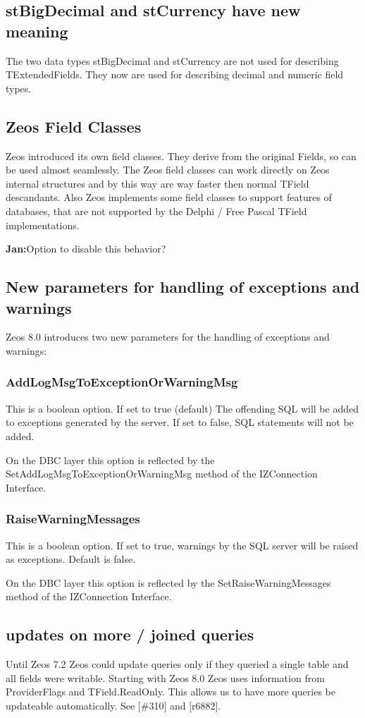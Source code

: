 \documentclass[a4paper,12pt,oneside]{article}
\begin{document}
\subsection{stBigDecimal and stCurrency have new meaning}
The two data types stBigDecimal and stCurrency are not used for describing TExtendedFields.
They now are used for describing decimal and numeric field types.

\subsection{Zeos Field Classes}
Zeos introduced its own field classes.
They derive from the original Fields, so can be used almost seamlessly.
The Zeos field classes can work directly on Zeos internal structures and by this way are way faster then normal TField descandants.
Also Zeos implements some field classes to support features of databases, that are not supported by the Delphi / Free Pascal TField implementations.

\textbf{Jan:}Option to disable this behavior?

\subsection{New parameters for handling of exceptions and warnings}
Zeos 8.0 introduces two new parameters for the handling of exceptions and warnings:

\subsubsection{AddLogMsgToExceptionOrWarningMsg }
This is a boolean option.
If set to true (default) The offending SQL will be added to exceptions generated by the server.
If set to false, SQL statements will not be added.

On the DBC layer this option is reflected by the SetAddLogMsgToExceptionOrWarningMsg method of the IZConnection Interface.

\subsubsection{RaiseWarningMessages}
This is a boolean option.
If set to true, warnings by the SQL server will be raised as exceptions.
Default is false.

On the DBC layer this option is reflected by the SetRaiseWarningMessages method of the IZConnection Interface.

\subsection{updates on more / joined queries}
Until Zeos 7.2 Zeos could update queries only if they queried a single table and all fields were writable.
Starting with Zeos 8.0 Zeos uses information from ProviderFlags and TField.ReadOnly.
This allows us to have more queries be updateable automatically.
See [\#310] and [r6882].
\end{document}
